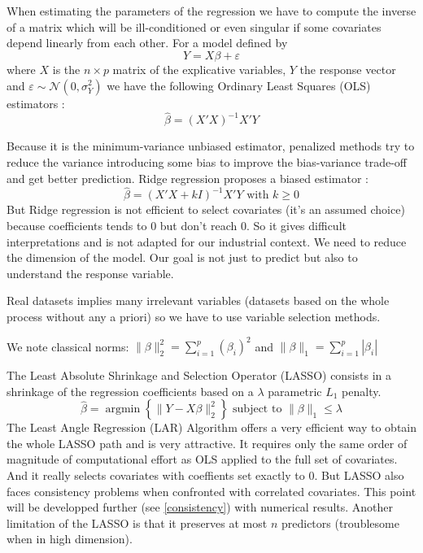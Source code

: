 \documentclass[11pt,a4paper]{article}
\begin{document}
		~\\	~\\
	

	When estimating the parameters of the regression we have to compute the inverse of a matrix\cite{saporta2006probabilites} which will be ill-conditioned or even singular if some covariates depend linearly from each other. For a model defined by \begin{equation}
	Y=X\beta + \varepsilon
	\end{equation}
	where $X$ is the $n\times p$ matrix of the explicative variables, $Y$ the response vector and $\varepsilon \sim \mathcal{N}(0,\sigma_Y^2)$ 
	we have the following Ordinary Least Squares (OLS) estimators :
	\begin{equation}
		\hat{\beta}=\left(X'X \right) ^{-1}X'Y
	\end{equation}
	
	Because it is the minimum-variance unbiased estimator, penalized methods try to reduce the variance introducing some bias to improve the bias-variance trade-off and get better prediction.
	Ridge regression\cite{marquardt1975ridge} proposes a biased estimator :
	\begin{equation}
		\hat{\beta}=(X'X+kI)^{-1}X'Y \textrm{ with } k\geq 0 
	\end{equation}
	But Ridge regression is not efficient to select covariates (it's an assumed choice) because coefficients tends to 0 but don't reach 0.
	So it gives difficult interpretations and is not adapted for our industrial context. We need to reduce the dimension of the model. Our goal is not just to predict but also to understand the response variable.
	

	Real datasets implies many irrelevant variables (datasets based on the whole process without any a priori) so we have to use variable selection methods.
	
	We note classical norms: $\parallel\beta\parallel_2^2=\sum_{i=1}^p(\beta_i)^2$ and $\parallel\beta \parallel_1=\sum_{i=1}^p|\beta_i| $
	
	The Least Absolute Shrinkage and Selection Operator (LASSO)\cite{tibshirani1996regression} consists in a shrinkage of the regression coefficients based on a $\lambda$ parametric $L_1$ penalty.
		\begin{equation}
		 \hat{\beta}=\operatorname{argmin} \left\lbrace \parallel Y-X\beta\parallel_2^2 \right\rbrace \textrm{ subject to } \parallel\beta\parallel_1\leq \lambda
		\end{equation}	
	 The Least Angle Regression\cite{efron2004least} (LAR) Algorithm offers a very efficient way to obtain the whole LASSO path and is very attractive. It requires only the same order of magnitude of computational effort as OLS applied to the full set of covariates. And it  really selects covariates with coeffients set exactly to 0.
	 But LASSO also faces consistency problems\cite{Zhao2006MSC} when confronted  with correlated covariates. This point will be developped further (see \ref{consistency}) with numerical results. Another limitation of the LASSO is that it preserves at most $n$ predictors (troublesome when in high dimension).
	 
\end{document}
